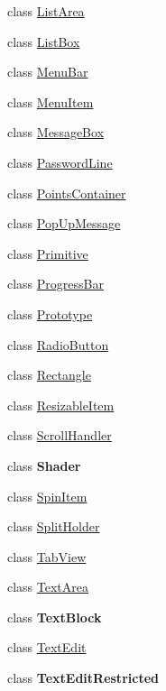 \begin{DoxyCompactItemize}
\item 
class \mbox{\hyperlink{class_space_v_i_l_1_1_list_area}{List\+Area}}
\item 
class \mbox{\hyperlink{class_space_v_i_l_1_1_list_box}{List\+Box}}
\item 
class \mbox{\hyperlink{class_space_v_i_l_1_1_menu_bar}{Menu\+Bar}}
\item 
class \mbox{\hyperlink{class_space_v_i_l_1_1_menu_item}{Menu\+Item}}
\item 
class \mbox{\hyperlink{class_space_v_i_l_1_1_message_box}{Message\+Box}}
\item 
class \mbox{\hyperlink{class_space_v_i_l_1_1_password_line}{Password\+Line}}
\item 
class \mbox{\hyperlink{class_space_v_i_l_1_1_points_container}{Points\+Container}}
\item 
class \mbox{\hyperlink{class_space_v_i_l_1_1_pop_up_message}{Pop\+Up\+Message}}
\item 
class \mbox{\hyperlink{class_space_v_i_l_1_1_primitive}{Primitive}}
\item 
class \mbox{\hyperlink{class_space_v_i_l_1_1_progress_bar}{Progress\+Bar}}
\item 
class \mbox{\hyperlink{class_space_v_i_l_1_1_prototype}{Prototype}}
\item 
class \mbox{\hyperlink{class_space_v_i_l_1_1_radio_button}{Radio\+Button}}
\item 
class \mbox{\hyperlink{class_space_v_i_l_1_1_rectangle}{Rectangle}}
\item 
class \mbox{\hyperlink{class_space_v_i_l_1_1_resizable_item}{Resizable\+Item}}
\item 
class \mbox{\hyperlink{class_space_v_i_l_1_1_scroll_handler}{Scroll\+Handler}}
\item 
class {\bfseries Shader}
\item 
class \mbox{\hyperlink{class_space_v_i_l_1_1_spin_item}{Spin\+Item}}
\item 
class \mbox{\hyperlink{class_space_v_i_l_1_1_split_holder}{Split\+Holder}}
\item 
class \mbox{\hyperlink{class_space_v_i_l_1_1_tab_view}{Tab\+View}}
\item 
class \mbox{\hyperlink{class_space_v_i_l_1_1_text_area}{Text\+Area}}
\item 
class {\bfseries Text\+Block}
\item 
class \mbox{\hyperlink{class_space_v_i_l_1_1_text_edit}{Text\+Edit}}
\item 
class {\bfseries Text\+Edit\+Restricted}

\end{DoxyCompactItemize}
